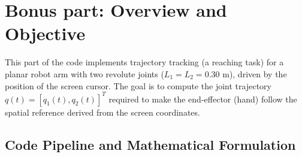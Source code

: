\newpage
\section{Bonus part: Overview and Objective}
This part of the code implements trajectory tracking (a reaching task) for a planar robot arm with two revolute joints ($L_1 = L_2 = 0.30\text{ m}$), driven by the position of the screen cursor. The goal is to compute the joint trajectory $q(t) = [q_1(t), q_2(t)]^T$ required to make the end-effector (hand) follow the spatial reference derived from the screen coordinates.

\subsection{Code Pipeline and Mathematical Formulation}

